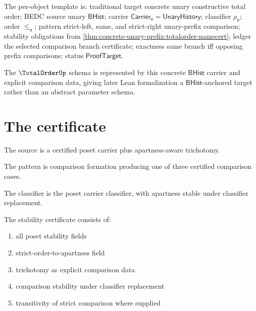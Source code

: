 The per-object template is: traditional target concrete unary constructive
total order; BEDC source unary $\mathsf{BHist}$; carrier
$\mathsf{Carrier}_{\mathsf{u}}=\mathsf{UnaryHistory}$; classifier
$\rho_{\mathsf{u}}$; order $\le_{\mathsf{u}}$; pattern strict-left,
same, and strict-right unary-prefix comparison; stability obligations from
\autoref{thm:concrete-unary-prefix-totalorder-namecert}; ledger the selected
comparison branch certificate; exactness same branch iff opposing prefix
comparisons; status $\mathsf{ProofTarget}$.

The $\TotalOrderUp$ schema is represented by this concrete $\mathsf{BHist}$
carrier and explicit comparison data, giving later Lean formalization a
$\mathsf{BHist}$-anchored target rather than an abstract parameter schema.

\section{The certificate}

\begin{definition}
\label{def:totalorder-source-specification}
The source is a certified poset carrier plus apartness-aware trichotomy.
\end{definition}

\begin{definition}
\label{def:totalorder-pattern-specification}
The pattern is comparison formation producing one of three certified comparison cases.
\end{definition}

\begin{definition}
\label{def:totalorder-classifier-specification}
The classifier is the poset carrier classifier, with apartness stable under classifier replacement.
\end{definition}

\begin{definition}
\label{def:totalorder-stability-certificate}
The stability certificate consists of:
\begin{enumerate}
  \item all poset stability fields
  \item strict-order-to-apartness field
  \item trichotomy as explicit comparison data
  \item comparison stability under classifier replacement
  \item transitivity of strict comparison where supplied
\end{enumerate}
\end{definition}

